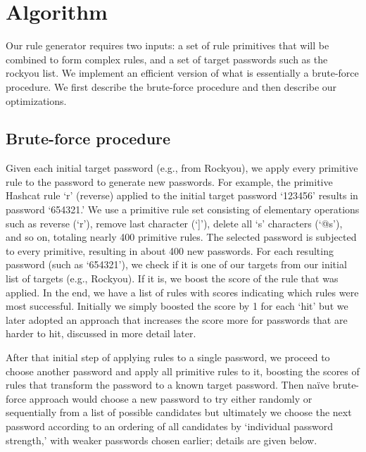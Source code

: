 \documentclass[letterpaper,twocolumn,10pt]{article}
\begin{document}


\section{Algorithm}
\label{sec:algorithm}

Our rule generator requires two inputs: a set of rule primitives that will be
combined to form complex rules, and a set of target passwords such as the
rockyou list. We implement an efficient version of what is essentially a
brute-force procedure. We first describe the brute-force procedure and then
describe our optimizations.


\subsection{Brute-force procedure}

Given each initial target password (e.g., from Rockyou), we apply every
primitive rule to the password to generate new passwords. For example, the
primitive Hashcat rule `r' (reverse) applied to the initial target password
`123456' results in password `654321.' We use a primitive rule set consisting
of elementary operations such as reverse (`r'), remove last character (`]'),
delete all `s' characters (`@s'), and so on, totaling nearly 400 primitive
rules. The selected password is subjected to every primitive, resulting in about
400 new passwords. For each resulting password (such as `654321'), we check if
it is one of our targets from our initial list of targets (e.g., Rockyou). If it
is, we boost the score of the rule that was applied. In the end, we have a list
of rules with scores indicating which rules were most successful. Initially
we simply boosted the score by 1 for each `hit' but we later adopted an
approach that increases the score more for passwords that are harder to hit,
discussed in more detail later.

After that initial step of applying rules to a single password, we proceed to
choose another password and apply all primitive rules to it, boosting the
scores of rules that transform the password to a known target password. Then
naïve brute-force approach would choose a new password to try either randomly
or sequentially from a list of possible candidates but ultimately we
choose the next password according to an ordering of all candidates by
`individual password strength,' with weaker passwords chosen earlier; details
are given below.
\end{document}
